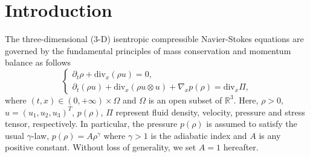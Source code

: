 \documentclass[10pt,reqno]{amsart}
\numberwithin{equation}{section}
\newcommand{\ddiv}{\mathrm{div}}
\begin{document}
\section{Introduction}
The three-dimensional (3-D) isentropic compressible Navier-Stokes equations are governed by the fundamental principles of mass conservation and momentum balance as follows
\begin{equation}\label{1.1}
\begin{cases}
\partial_t\rho+\ddiv_x(\rho u)=0,\\
\partial_t (\rho u)+\ddiv_x(\rho u\otimes u)+\nabla_x p(\rho)=\ddiv_x \Pi,%
\end{cases}
\end{equation}
where $(t, x)\in (0, +\infty)\times \Omega$ and  $\Omega$ is  an open subset of $\mathbb R^3$. Here, $\rho>0$, $u=(u_1, u_2, u_3)^T$, $p(\rho)$, $\Pi$ represent fluid density, velocity, pressure and stress tensor, respectively. In particular, the pressure $p(\rho)$ is assumed to satisfy the usual $\gamma$-law, $p(\rho)=A \rho^\gamma$ where $\gamma>1$ is the adiabatic index and $A$ is any positive constant. Without loss of generality, we set $A=1$ hereafter.
\end{document}
